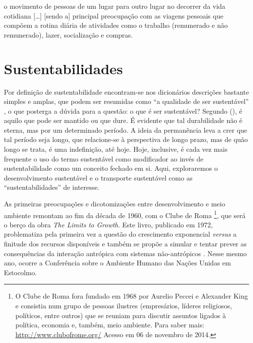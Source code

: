 \begin{citacao}
o movimento de pessoas de um lugar para outro lugar no decorrer da vida cotidiana [\ldots] [sendo a] principal preocupação com as viagens pessoais que compõem a rotina diária de atividades como o trabalho (remunerado e não remunerado), lazer, socialização e compras.
\cite[p.7]{HANSON2010}
\end{citacao} 


\clearpage
\section{Sustentabilidades}

Por definição de sustentabilidade encontram-se nos dicionários descrições bastante simples e amplas, que podem ser resumidas como ``a qualidade de ser sustentável'' \cite{MICHAELIS2014}, o que posterga a dúvida para a questão: o que é ser sustentável? Segundo  (\citeyear{BLACK2010}), é aquilo que pode ser mantido ou que dure. É evidente que tal durabilidade não é eterna, mas por um determinado período. A ideia da permanência leva a crer que tal período seja longo, que relacione-se à perspectiva de longo prazo, mas de quão longo se trata, é uma indefinição, até hoje. Hoje, inclusive, é cada vez mais frequente o uso do termo sustentável como modificador ao invés de sustentabilidade como um conceito fechado em si. Aqui, exploraremos o desenvolvimento  sustentável e o transporte sustentável como as ``sustentabilidades'' de interesse.

As primeiras preocupações e dicotomizações entre desenvolvimento e meio ambiente remontam ao fim da década de 1960, com o Clube de Roma%
\footnote{O Clube de Roma fora fundado em 1968 por Aurelio Peccei e Alexander King e consistia num grupo de pessoas ilustres (empresários, líderes religiosos, políticos, entre outros) que se reuniam para discutir assuntos ligados à política, economia e, também, meio ambiente. Para saber mais: \url{http://www.clubofrome.org/} Acesso em 06 de novembro de 2014.}, que será o berço da obra \emph{The Limits to Growth}. Este livro, publicado em 1972, problematiza pela primeira vez a questão do crescimento exponencial \emph{versus} a finitude dos recursos disponíveis e também se propõe a simular e tentar prever as consequências da interação antrópica com sistemas não-antrópicos \cite{MEADOWS1972}. Nesse mesmo ano, ocorre a Conferência sobre o Ambiente Humano das Nações Unidas em Estocolmo.

